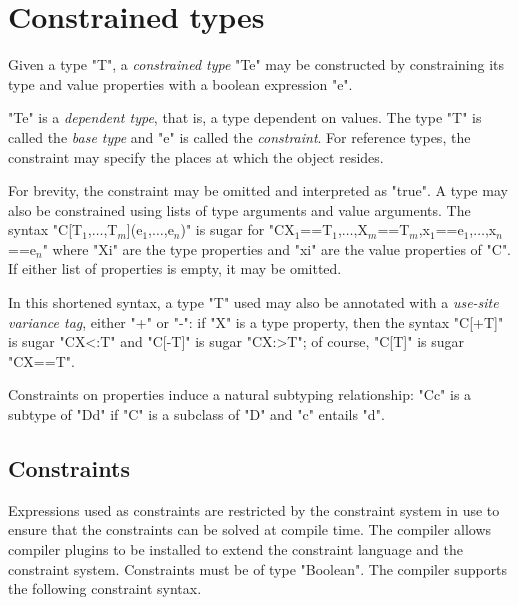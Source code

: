 \section{Constrained types}
\label{ConstrainedTypes}
\label{DepType:DepType}
\label{DepTypes}


        Given a type \xcd"T", a {\em constrained type}
        \xcd"T{e}" may be
        constructed by constraining its type and value properties with a
        boolean expression \xcd"e".

        \xcd"T{e}" is a {\em dependent type}, that is, a type
        dependent on values.
        The type \xcd"T" is called the
        {\em base type} and \xcd"e" is called the {\em constraint}.
        For reference types, the constraint may
        specify the places at which the object resides.

For brevity, the constraint may be omitted and
interpreted as \xcd"true".
A type may also be constrained using lists of type arguments and
value arguments.
The syntax 
\xcdmath"C[T$_1$,$\dots$,T$_m$](e$_1$,$\dots$,e$_n$)" is sugar for
\xcdmath"C{X$_1$==T$_1$,$\dots$,X$_m$==T$_m$,x$_1$==e$_1$,$\dots$,x$_n$==e$_n$}"
where \xcd"Xi" are the type properties and \xcd"xi" are the
value properties of \xcd"C".  
If either list of properties is empty, it may be omitted.

In this shortened syntax, a type \xcd"T" used may also be annotated
with
a \emph{use-site variance tag}, either \xcd"+" or \xcd"-":
if \xcd"X" is a type property, then
the syntax \xcd"C[+T]" is sugar \xcd"C{X<:T}" and
\xcd"C[-T]" is sugar \xcd"C{X:>T}"; of course,
\xcd"C[T]" is sugar \xcd"C{X==T}".

Constraints on properties induce a natural subtyping relationship:
\xcd"C{c}" is a subtype of
\xcd"D{d}" if \xcd"C" is a subclass of \xcd"D" and
\xcd"c" entails \xcd"d".

\subsection{Constraints}

\def\withmath#1{\relax\ifmmode#1\else{$#1$}\fi}
\def\LL#1{\withmath{\lbrack\!\lbrack #1\rbrack\!\rbrack}}

Expressions used as constraints are restricted by the
constraint system in use to ensure that the constraints can
be solved at compile time.  The \Xten{} compiler allows compiler
plugins to be installed to extend the constraint language and
the
constraint system.
Constraints must be of type \xcd"Boolean".
The
compiler supports the following constraint syntax.

